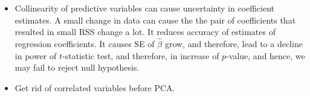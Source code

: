 \begin{itemize}
     
     \item Collinearity of predictive variables can cause uncertainty in
              coefficient estimates. A small change in data can cause
              the the pair of coefficients that resulted in small RSS 
              change a lot. It reduces accuracy of estimates 
              of regression coefficients. It causes SE of $\hat \beta$ grow,
              and therefore, lead to a decline in power of $t$-statistic test,
              and therefore, in increase of $p$-value, and hence, we may
              fail to reject null hypothesis.

      \item Get rid of correlated variables before PCA.
      
\end{itemize}


